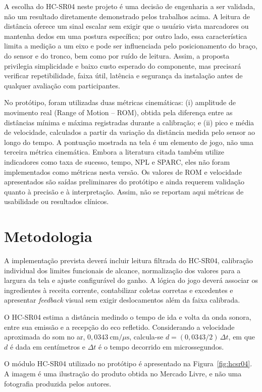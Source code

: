 \documentclass[12pt]{article}
\begin{document}
A escolha do HC-SR04 neste projeto é uma decisão de engenharia a ser validada, não um resultado diretamente demonstrado pelos trabalhos acima. A leitura de distância oferece um sinal escalar sem exigir que o usuário vista marcadores ou mantenha dedos em uma postura específica; por outro lado, essa característica limita a medição a um eixo e pode ser influenciada pelo posicionamento do braço, do sensor e do tronco, bem como por ruído de leitura. Assim, a proposta privilegia simplicidade e baixo custo esperado do componente, mas precisará verificar repetibilidade, faixa útil, latência e segurança da instalação antes de qualquer avaliação com participantes.

No protótipo, foram utilizadas duas métricas cinemáticas: (i) amplitude de movimento real (Range of Motion -- ROM), obtida pela diferença entre as distâncias mínima e máxima registradas durante a calibração; e (ii) pico e média de velocidade, calculados a partir da variação da distância medida pelo sensor ao longo do tempo. A pontuação mostrada na tela é um elemento de jogo, não uma terceira métrica cinemática. Embora a literatura citada também utilize indicadores como taxa de sucesso, tempo, NPL e SPARC, eles não foram implementados como métricas nesta versão. Os valores de ROM e velocidade apresentados são saídas preliminares do protótipo e ainda requerem validação quanto à precisão e à interpretação. Assim, não se reportam aqui métricas de usabilidade ou resultados clínicos.

\section{Metodologia}

A implementação prevista deverá incluir leitura filtrada do HC-SR04, calibração individual dos limites funcionais de alcance, normalização dos valores para a largura da tela e ajuste configurável do ganho. A lógica do jogo deverá associar os ingredientes à receita corrente, contabilizar coletas corretas e excedentes e apresentar \textit{feedback} visual sem exigir deslocamentos além da faixa calibrada.

O HC-SR04 estima a distância medindo o tempo de ida e volta da onda sonora, entre sua emissão e a recepção do eco refletido. Considerando a velocidade aproximada do som no ar, $0{,}0343~\mathrm{cm}/\mu\mathrm{s}$, calcula-se $d=(0{,}0343/2)\,\Delta t$, em que $d$ é dada em centímetros e $\Delta t$ é o tempo decorrido em microssegundos.

O módulo HC-SR04 utilizado no protótipo é apresentado na Figura~\ref{fig:hcsr04}. A imagem é uma ilustração do produto obtida no Mercado Livre, e não uma fotografia produzida pelos autores.
\end{document}
